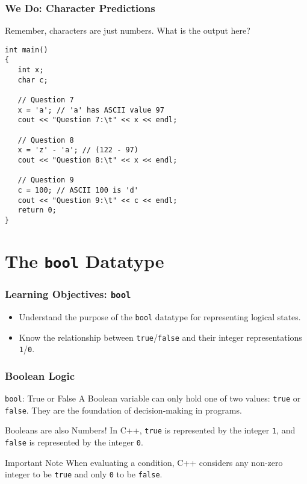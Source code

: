 \documentclass{beamer}
\begin{document}
\begin{frame}[fragile]
\frametitle{We Do: Character Predictions}
Remember, characters are just numbers. What is the output here?\pause
\begin{verbatim}
int main()
{
   int x;
   char c;

   // Question 7
   x = 'a'; // 'a' has ASCII value 97
   cout << "Question 7:\t" << x << endl;
   
   // Question 8
   x = 'z' - 'a'; // (122 - 97)
   cout << "Question 8:\t" << x << endl;

   // Question 9
   c = 100; // ASCII 100 is 'd'
   cout << "Question 9:\t" << c << endl;
   return 0;
}
\end{verbatim}
\end{frame}

\section{The \texttt{bool} Datatype}

\begin{frame}
\frametitle{Learning Objectives: \texttt{bool}}
\begin{itemize}
    \item Understand the purpose of the \texttt{bool} datatype for representing logical states.\pause
    \item Know the relationship between \texttt{true}/\texttt{false} and their integer representations \texttt{1}/\texttt{0}.
\end{itemize}
\end{frame}

\begin{frame}
\frametitle{Boolean Logic}
\begin{block}{\texttt{bool}: True or False}
A Boolean variable can only hold one of two values: \texttt{true} or \texttt{false}. They are the foundation of decision-making in programs.
\end{block}\pause

\begin{alertblock}{Booleans are also Numbers!}
In C++, \texttt{true} is represented by the integer \texttt{1}, and \texttt{false} is represented by the integer \texttt{0}.
\end{alertblock}\pause

\begin{exampleblock}{Important Note}
When evaluating a condition, C++ considers any non-zero integer to be \texttt{true} and only \texttt{0} to be \texttt{false}.
\end{exampleblock}
\end{frame}
\end{document}
